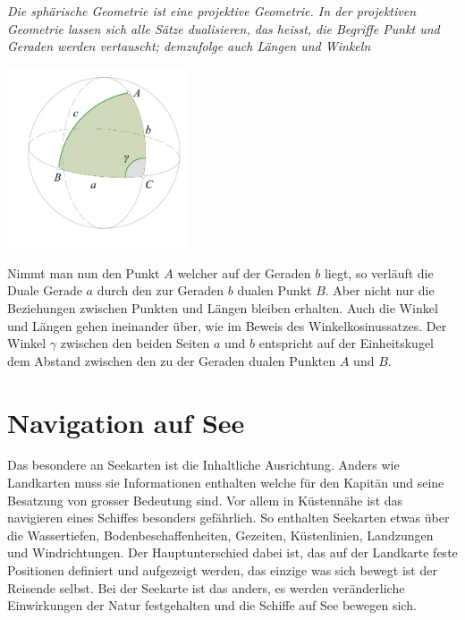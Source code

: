 \begin{refsection}
\begin{satz}\textit{Die sphärische Geometrie ist eine projektive Geometrie. In der projektiven Geometrie lassen sich alle Sätze dualisieren, das heisst, die Begriffe Punkt und Geraden werden vertauscht; demzufolge auch Längen und Winkeln}
\label{skript:kugel:satz:Dualitaet}
\end{satz}

\begin{center}
        \includegraphics[width=0.4\textwidth]{kugel/_Dualitat.jpg}
\end{center}

Nimmt man nun den Punkt $A$ welcher auf der Geraden $b$ liegt, so verläuft die Duale Gerade $a$ durch den zur Geraden $b$ dualen Punkt $B$. 
Aber nicht nur die Beziehungen zwischen Punkten und Längen bleiben erhalten. Auch die Winkel und Längen gehen ineinander über, wie im Beweis des Winkelkosinussatzes.
Der Winkel $\gamma$ zwischen den beiden Seiten $a$ und $b$ entspricht auf der Einheitskugel dem Abstand zwischen den zu der Geraden dualen Punkten $A$ und $B$.



\section{Navigation auf See}
Das besondere an Seekarten ist die Inhaltliche Ausrichtung. Anders wie Landkarten muss sie Informationen enthalten welche für den Kapitän und seine Besatzung von grosser Bedeutung sind. Vor allem in Küstennähe ist das navigieren eines Schiffes besonders gefährlich. So enthalten Seekarten etwas über die Wassertiefen, Bodenbeschaffenheiten, Gezeiten, Küstenlinien, Landzungen und Windrichtungen.
Der Hauptunterschied dabei ist, das auf der Landkarte feste Positionen definiert und aufgezeigt werden, das einzige was sich bewegt ist der Reisende selbst. Bei der Seekarte ist das anders, es werden veränderliche Einwirkungen der Natur festgehalten und die Schiffe auf See bewegen sich.


\end{refsection}
